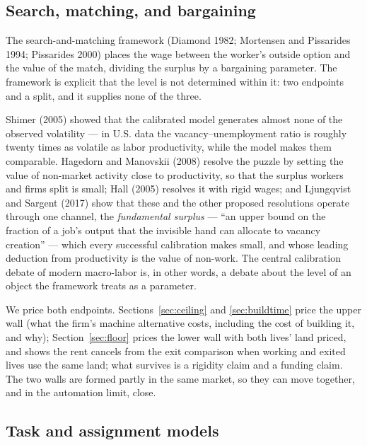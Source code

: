 \documentclass[12pt]{article}
\theoremstyle{plain}
\begin{document}
\subsection{Search, matching, and bargaining}\label{sec:search}

The search-and-matching framework (Diamond 1982; Mortensen and Pissarides 1994; Pissarides 2000) places the wage between the worker's outside option and the value of the match, dividing the surplus by a bargaining parameter. The framework is explicit that the level is not determined within it: two endpoints and a split, and it supplies none of the three.

Shimer (2005) showed that the calibrated model generates almost none of the observed volatility --- in U.S. data the vacancy--unemployment ratio is roughly twenty times as volatile as labor productivity, while the model makes them comparable. Hagedorn and Manovskii (2008) resolve the puzzle by setting the value of non-market activity close to productivity, so that the surplus workers and firms split is small; Hall (2005) resolves it with rigid wages; and Ljungqvist and Sargent (2017) show that these and the other proposed resolutions operate through one channel, the \emph{fundamental surplus} --- ``an upper bound on the fraction of a job's output that the invisible hand can allocate to vacancy creation'' --- which every successful calibration makes small, and whose leading deduction from productivity is the value of non-work. The central calibration debate of modern macro-labor is, in other words, a debate about the level of an object the framework treats as a parameter.

We price both endpoints. Sections~\ref{sec:ceiling} and \ref{sec:buildtime} price the upper wall (what the firm's machine alternative costs, including the cost of building it, and why); Section~\ref{sec:floor} prices the lower wall with both lives' land priced, and shows the rent cancels from the exit comparison when working and exited lives use the same land; what survives is a rigidity claim and a funding claim. The two walls are formed partly in the same market, so they can move together, and in the automation limit, close.

\subsection{Task and assignment models}\label{sec:tasks}
\end{document}
